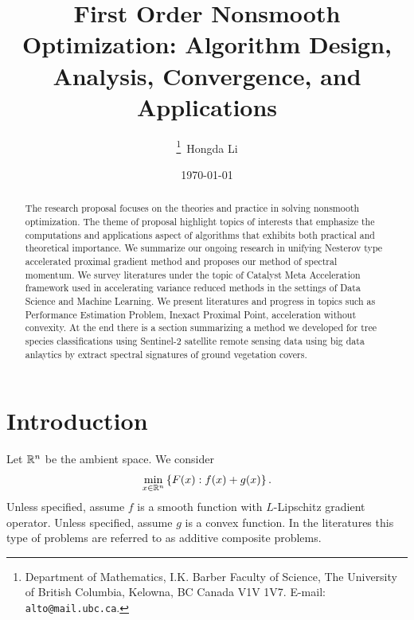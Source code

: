 \documentclass[12pt]{article}
\begin{document}
\title{
    {
        \selectfont 
        First Order Nonsmooth Optimization: 
        Algorithm Design, Analysis, Convergence, and Applications
    }
    }

\author{
    \thanks{Department of Mathematics, I.K. Barber Faculty of Science,
    The University of British Columbia, Kelowna, BC Canada V1V 1V7. 
    E-mail:  \texttt{alto@mail.ubc.ca}.}~Hongda Li
}

\date{\today}

\maketitle


\begin{abstract} 
    \noindent
    The research proposal focuses on the theories and practice in solving nonsmooth optimization. 
    The theme of proposal highlight topics of interests that emphasize the computations and applications aspect of algorithms that exhibits both practical and theoretical importance. 
    We summarize our ongoing research in unifying Nesterov type accelerated proximal gradient method and proposes our method of spectral momentum. 
    We survey literatures under the topic of Catalyst Meta Acceleration framework used in accelerating variance reduced methods in the settings of Data Science and Machine Learning. 
    We present literatures and progress in topics such as Performance Estimation Problem, Inexact Proximal Point, acceleration without convexity. 
    At the end there is a section summarizing a method we developed for tree species classifications using Sentinel-2 satellite remote sensing data using big data anlaytics by extract spectral signatures of ground vegetation covers. 


\end{abstract}


\tableofcontents

\section{Introduction}
    Let $\mathbb R^n$ be the ambient space. We consider 
    \begin{align}
        \min_{x \in \mathbb R^n} \left\lbrace
            F(x): f(x) + g(x)
        \right\rbrace.
    \end{align}\label{eqn:additive-comp-obj}
    Unless specified, assume $f$ is a smooth function with $L$-Lipschitz gradient operator. 
    Unless specified, assume $g$ is a convex function. 
    In the literatures this type of problems are referred to as additive composite problems. 
\end{document}
